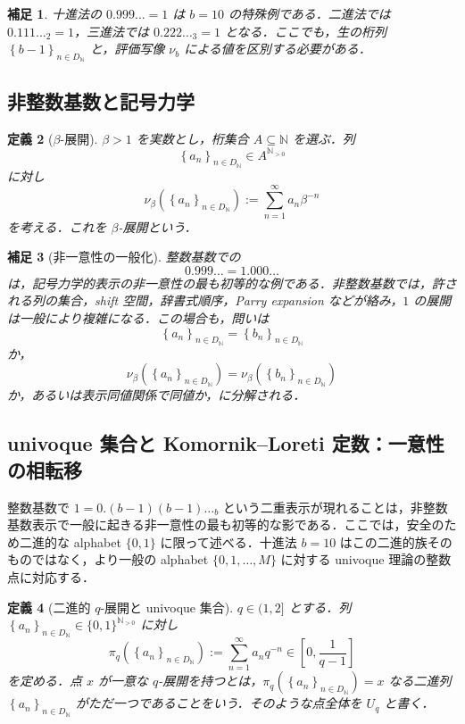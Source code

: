 \documentclass[a4paper,11pt]{ltjsarticle}
\theoremstyle{jpdef}
\newtheorem{definition}{定義}[section]
\newtheorem{remark}[definition]{補足}
\theoremstyle{jpthm}
\newcommand{\N}{\mathbb{N}}
\newcommand{\Ns}{\N_{>0}}
\newcommand{\DN}{D_{\N}}
\newcommand{\seq}[2]{\left\{#1\right\}_{#2}}
\begin{document}
\begin{remark}
十進法の \(0.999\ldots=1\) は \(b=10\) の特殊例である．二進法では \(0.111\ldots_2=1\)，三進法では \(0.222\ldots_3=1\) となる．ここでも，生の桁列 \(\seq{b-1}{n\in\DN}\) と，評価写像 \(\nu_b\) による値を区別する必要がある．
\end{remark}

\subsection{非整数基数と記号力学}

\begin{definition}[\(\beta\)-展開]
\(\beta>1\) を実数とし，桁集合 \(A\subseteq\N\) を選ぶ．列
\[
  \seq{a_n}{n\in\DN}\in A^{\Ns}
\]
に対し
\[
  \nu_\beta(\seq{a_n}{n\in\DN})
  :=\sum_{n=1}^{\infty}a_n\beta^{-n}
\]
を考える．これを \(\beta\)-展開という．
\end{definition}

\begin{remark}[非一意性の一般化]
整数基数での
\[
  0.999\ldots=1.000\ldots
\]
は，記号力学的表示の非一意性の最も初等的な例である．非整数基数では，許される列の集合，shift 空間，辞書式順序，Parry expansion などが絡み，\(1\) の展開は一般により複雑になる．この場合も，問いは
\[
  \seq{a_n}{n\in\DN}=\seq{b_n}{n\in\DN}
\]
か，
\[
  \nu_\beta(\seq{a_n}{n\in\DN})=\nu_\beta(\seq{b_n}{n\in\DN})
\]
か，あるいは表示同値関係で同値か，に分解される．
\end{remark}


\subsection{univoque 集合と Komornik--Loreti 定数：一意性の相転移}

整数基数で \(1=0.(b-1)(b-1)\ldots_b\) という二重表示が現れることは，非整数基数表示で一般に起きる非一意性の最も初等的な影である．ここでは，安全のため二進的な alphabet \(\{0,1\}\) に限って述べる．十進法 \(b=10\) はこの二進的族そのものではなく，より一般の alphabet \(\{0,1,\ldots,M\}\) に対する univoque 理論の整数点に対応する．

\begin{definition}[二進的 \(q\)-展開と univoque 集合]
\(q\in(1,2]\) とする．列 \(\seq{a_n}{n\in\DN}\in\{0,1\}^{\Ns}\) に対し
\[
  \pi_q(\seq{a_n}{n\in\DN})
  :=\sum_{n=1}^{\infty}a_nq^{-n}
  \in\left[0,\frac{1}{q-1}\right]
\]
を定める．点 \(x\) が一意な \(q\)-展開を持つとは，\(\pi_q(\seq{a_n}{n\in\DN})=x\) なる二進列 \(\seq{a_n}{n\in\DN}\) がただ一つであることをいう．そのような点全体を \(U_q\) と書く．
\end{definition}
\end{document}
